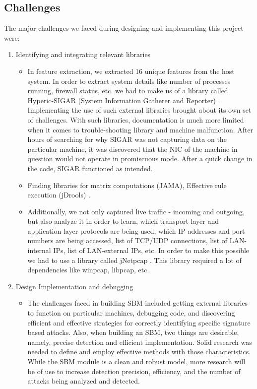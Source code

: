 \documentclass[conference]{sig-alternate-05-2015}
\begin{document}
\subsection{Challenges}\label{subsec:challenges}
The major challenges we faced during designing and implementing this project were:
\begin{enumerate}
  \item Identifying and integrating relevant libraries
  \begin{itemize}
    \item In feature extraction, we extracted 16 unique features from the host system. In order to extract system details like number of processes running, firewall status, etc. we had to make us of a library called Hyperic-SIGAR (System Information Gatherer and Reporter) \cite{sigar}. Implementing the use of such external libraries brought about its own set of challenges. With such libraries, documentation is much more limited when it comes to trouble-shooting library and machine malfunction. After hours of searching for why SIGAR was not capturing data on the particular machine, it was discovered that the NIC of the machine in question would not operate in promiscuous mode. After a quick change in the code, SIGAR functioned as intended.
    \item Finding libraries for matrix computations (JAMA)\cite{jama}, Effective rule execution (jDrools) \cite{drools}.
    \item Additionally, we not only captured live traffic - incoming and outgoing, but also analyze it in order to learn, which transport layer and application layer protocols are being used, which IP addresses and port numbers are being accessed, list of TCP/UDP connections, list of LAN-internal IPs, list of LAN-external IPs, etc. In order to make this possible we had to use a library called jNetpcap \cite{jnetpcap}. This library required a lot of dependencies like winpcap, libpcap, etc.
  \end{itemize}
  \newpage
  \item Design Implementation and debugging
  \begin{itemize}
    \item The challenges faced in building SBM included getting external libraries to function on particular machines, debugging code, and discovering efficient and effective strategies for correctly identifying specific signature based attacks. Also, when building an SBM, two things are desirable, namely, precise detection and efficient implementation. 
    \newline Solid research was needed to define and employ effective methods with those characteristics. While the SBM module is a clean and robust model, more research will be of use to increase detection precision, efficiency, and the number of attacks being analyzed and detected.

\end{itemize}
\end{enumerate}
\end{document}
